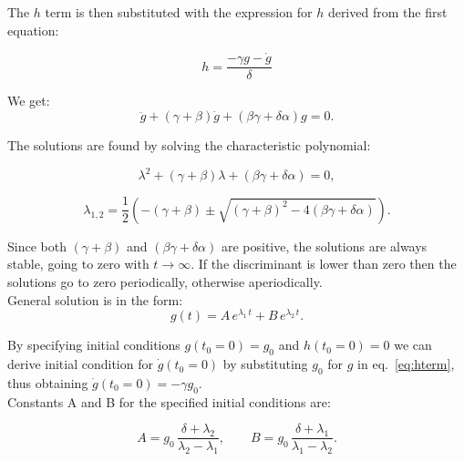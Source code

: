 \documentclass{article}
\begin{document}
 The $h$ term is then substituted with the expression for $h$ derived from the first equation:
 
\begin{equation}
\label{eq:hterm}
h=\frac{-\gamma g -\dot g}{\delta}
\end{equation} 

We get:
\begin{equation}
	\label{Eq:secondOrderDE}
	\ddot g+(\gamma+\beta)\dot g+(\beta \gamma+\delta \alpha)g=0.
\end{equation}

The solutions are found by solving the characteristic polynomial:

\begin{equation}
	\label{Eq:charEqn}
	\lambda^2+(\gamma+\beta)\lambda+(\beta\gamma+\delta\alpha)=0,
\end{equation}

\begin{equation}
	\label{Eq:rootsOfCharEqn}
	\lambda_{1,2}=\frac{1}{2}\left(-(\gamma+\beta)\pm \sqrt{(\gamma+\beta)^2-4(\beta\gamma+\delta\alpha)}\right).
\end{equation}

Since both $(\gamma+\beta)$ and $(\beta\gamma+\delta\alpha)$ are positive, the solutions are always stable, going to zero with $t\rightarrow \infty$. If the discriminant is lower than zero then the solutions go to zero periodically, otherwise aperiodically.\\


General solution is in the form:
\begin{equation}
	\label{Eq:genSol}
	g(t) = A\,e^{\lambda_1 \, t} + B\,e^{\lambda_2 \, t}.
\end{equation}

By specifying initial conditions $g(t_0=0) = g_0$ and $h(t_0=0)=0$ we can derive initial condition for $\dot g(t_0=0)$ by substituting $g_0$ for $g$ in eq.~\ref{eq:hterm}, thus obtaining $\dot g(t_0=0)=-\gamma g_0$.\\

Constants A and B for the specified initial conditions are:
 
\begin{equation*}
	\label{Eq:genSolParams}
	A = g_0\,\frac{\delta+\lambda_2}{\lambda_2-\lambda_1}, \qquad B = g_0\,\frac{\delta+\lambda_1}{\lambda_1-\lambda_2}.
\end{equation*}
\end{document}
